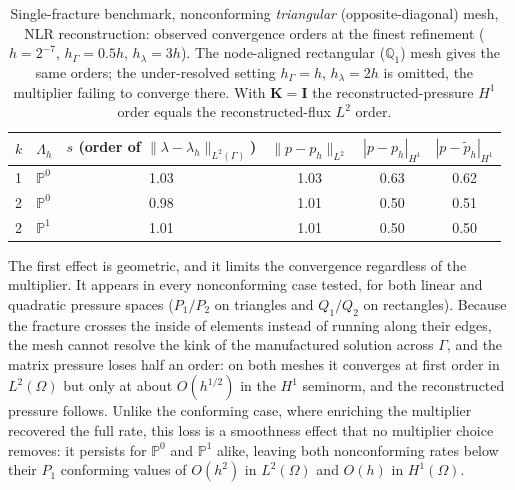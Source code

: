 \documentclass[a4paper,fleqn]{cas-sc}
\newcommand{\Kmat}{\mathbf{K}}
\begin{document}
\begin{table}[H]
\centering
\caption{Single-fracture benchmark, nonconforming \emph{triangular}
(opposite-diagonal) mesh, NLR reconstruction: observed convergence orders at the
finest refinement (\(h=2^{-7}\), \(h_\Gamma=0.5h\), \(h_\lambda=3h\)). The
node-aligned rectangular (\(\mathbb{Q}_1\)) mesh gives the same orders; the
under-resolved setting \(h_\Gamma=h\), \(h_\lambda=2h\) is omitted, the multiplier
failing to converge there. With \(\Kmat=\mathbf{I}\) the reconstructed-pressure
\(H^1\) order equals the reconstructed-flux \(L^2\) order.}
\label{tab:single_fracture_nonconforming_orders}
\begin{tabular}{llcccc}
\toprule
\(k\) & \(\Lambda_h\) &
\(s\) (order of \(\|\lambda-\lambda_h\|_{L^2(\Gamma)}\)) &
\(\|p-p_h\|_{L^2}\) &
\(|p-p_h|_{H^1}\) &
\(|p-\widetilde p_h|_{H^1}\)\\
\midrule
1 & \(\mathbb{P}^0\) & 1.03 & 1.03 & 0.63 & 0.62\\
2 & \(\mathbb{P}^0\) & 0.98 & 1.01 & 0.50 & 0.51\\
2 & \(\mathbb{P}^1\) & 1.01 & 1.01 & 0.50 & 0.50\\
\bottomrule
\end{tabular}
\end{table}

The first effect is geometric, and it limits the convergence regardless of the
multiplier. It appears in every nonconforming case tested, for both linear and
quadratic pressure spaces (\(P_1/P_2\) on triangles and \(Q_1/Q_2\) on
rectangles). Because the fracture crosses the inside of elements instead of
running along their edges, the mesh cannot resolve the kink of the manufactured
solution across \(\Gamma\), and the matrix pressure loses half an order: on both
meshes it converges at first order in \(L^2(\Omega)\) but only at about
\(O(h^{1/2})\) in the \(H^1\) seminorm, and the reconstructed pressure follows.
Unlike the conforming case, where enriching the multiplier recovered the full
rate, this loss is a smoothness effect that no multiplier choice removes: it
persists for \(\mathbb{P}^0\) and \(\mathbb{P}^1\) alike, leaving both
nonconforming rates below their \(P_1\) conforming values of \(O(h^2)\) in
\(L^2(\Omega)\) and \(O(h)\) in \(H^1(\Omega)\).
\end{document}
